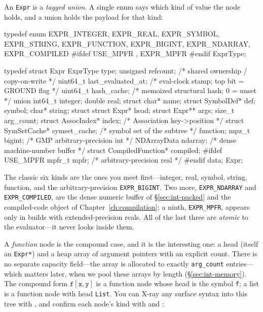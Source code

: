 An \texttt{Expr} is a \emph{tagged union}. A single enum says which kind of value the
node holds, and a union holds the payload for that kind:

\begin{ccode}
typedef enum {
    EXPR_INTEGER, EXPR_REAL, EXPR_SYMBOL, EXPR_STRING,
    EXPR_FUNCTION, EXPR_BIGINT, EXPR_NDARRAY, EXPR_COMPILED
#ifdef USE_MPFR
    , EXPR_MPFR
#endif
} ExprType;

typedef struct Expr {
    ExprType type;
    unsigned refcount;            /* shared ownership / copy-on-write         */
    uint64_t last_evaluated_at;   /* eval-clock stamp; top bit = GROUND flag  */
    uint64_t hash_cache;          /* memoized structural hash; 0 = unset      */
    union {
        int64_t integer;
        double  real;
        struct { char* name; struct SymbolDef* def; } symbol;
        char*   string;
        struct {
            struct Expr*  head;
            struct Expr** args;
            size_t        arg_count;
            struct AssocIndex*  index;         /* Association key->position   */
            struct SymSetCache* symset_cache;  /* symbol set of the subtree  */
        } function;
        mpz_t bigint;                          /* GMP arbitrary-precision int */
        NDArrayData ndarray;                   /* dense machine-number buffer */
        struct CompiledFunction* compiled;
#ifdef USE_MPFR
        mpfr_t mpfr;                           /* arbitrary-precision real    */
#endif
    } data;
} Expr;
\end{ccode}

The classic six kinds are the ones you meet first---integer, real, symbol, string,
function, and the arbitrary-precision \texttt{EXPR\_BIGINT}. Two more,
\texttt{EXPR\_NDARRAY} and \texttt{EXPR\_COMPILED}, are the dense numeric buffer of
\S\ref{sec:int-packed} and the compiled-code object of
Chapter~\ref{ch:compilation}; a ninth, \texttt{EXPR\_MPFR}, appears only in builds
with extended-precision reals. All of the last three are \emph{atomic} to the
evaluator---it never looks inside them.

A \emph{function} node is the compound case, and it is the interesting one: a head
(itself an \texttt{Expr*}) and a heap array of argument pointers with an explicit
count. There is no separate capacity field---the array is allocated to exactly
\texttt{arg\_count} entries---which matters later, when we pool these arrays by
length (\S\ref{sec:int-memory}). The compound form \(\mathtt{f[x, y]}\) is a function
node whose head is the symbol \texttt{f}; a list is a function node with head
\texttt{List}. You can X-ray any surface syntax into this tree with , and
confirm each node's kind with  and :

